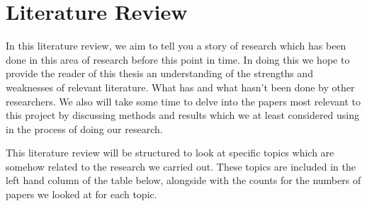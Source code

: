 \section{Literature Review}
In this literature review, we aim to tell you a story of research which has been done in this area of research before this point in time. In doing this we hope to provide the reader of this thesis an understanding of the strengths and weaknesses of relevant literature. What has and what hasn't been done by other researchers. We also will take some time to delve into the papers most relevant to this project by discussing methods and results which we at least considered using in the process of doing our research.\medskip

This literature review will be structured to look at specific topics which are somehow related to the research we carried out. These topics are included in the left hand column of the table below, alongside with the counts for the numbers of papers we looked at for each topic.








